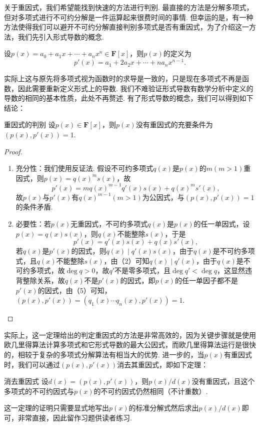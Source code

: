 关于重因式，我们希望能找到快速的方法进行判别. 最直接的方法是分解多项式，但对多项式进行不可约分解是一件运算起来很费时间的事情. 但幸运的是，有一种方法使得我们可以避开不可约分解直接判别多项式是否有重因式，为了介绍这一方法，我们先引入形式导数的概念.
\begin{definition}{}{}
    设$p(x)=a_0+a_1x+\cdots+a_nx^n\in\mathbf{F}[x]$，则$p(x)$的定义为
    \[p'(x)=a_1+2a_2x+\cdots+na_nx^{n-1}.\]
\end{definition}
实际上这与原先将多项式视为函数时的求导是一致的，只是现在多项式不再是函数，因此需要重新定义形式上的导数. 我们不难验证形式导数有数学分析中定义的导数的相同的基本性质，此处不再赘述. 有了形式导数的概念，我们可以得到如下结论：
\begin{theorem}{}{重因式的判别}
    设$p(x)\in\mathbf{F}[x]$，则$p(x)$没有重因式的充要条件为$(p(x),p'(x))=1$.
\end{theorem}
\begin{proof}
    \begin{enumerate}
        \item 充分性：我们使用反证法. 假设不可约多项式$q(x)$是$p(x)$的$m(m>1)$重因式，则$p(x)=q(x)^ms(x)$，故
              \[p'(x)=mq(x)^{m-1}q'(x)s(x)+q(x)^ms'(x),\]
              故$p(x)$与$p'(x)$有$q(x)^{m-1}(m>1)$为公因式，与$(p(x),p'(x))=1$的条件矛盾.
        \item 必要性：若$p(x)$无重因式，不可约多项式$q(x)$是$p(x)$的任一单因式，设$p(x)=q(x)s(x)$，则$q(x)$不能整除$s(x)$，于是
              \[p'(x)=q'(x)s(x)+q(x)s'(x),\]
              若$q(x)$是$p'(x)$的因式，则$q(x)\mid q'(x)s(x)$，由于$q(x)$是不可约多项式，且$q(x)$不能整除$s(x)$，由（2）可知$q(x)\mid q'(x)$，由于$q(x)$是不可约多项式，故$\deg q>0$，故$q'$不是零多项式，且$\deg q'<\deg q$，这显然违背整除关系，故$q(x)$不是$p'(x)$的因式，即$p(x)$的任一单因子都不是$p'(x)$的因式，由（5）可知，$(p(x),p'(x))=(q_1(x)\cdots q_n(x),p'(x))=1$.
    \end{enumerate}
\end{proof}

实际上，这一定理给出的判定重因式的方法是非常高效的，因为关键步骤就是使用欧几里得算法计算多项式和它形式导数的最大公因式，而欧几里得算法运行是很快的，相较于复杂的多项式分解算法有相当大的优势. 进一步的，当$p(x)$有重因式时，我们可以通过$(p(x),p'(x))$消去其重因式，即如下定理：
\begin{theorem}{}{消去重因式}
    设$d(x)=(p(x),p'(x))$，则$p(x)/d(x)$没有重因式，且这个多项式的不可约因式与$p(x)$的不可约因式仍然相同（不计重数）.
\end{theorem}
这一定理的证明只需要显式地写出$p(x)$的标准分解式然后求出$p(x)/d(x)$即可，非常直接，因此留作习题供读者练习.

